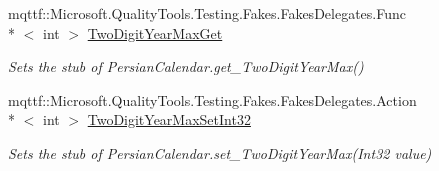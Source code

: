 \begin{DoxyCompactItemize}
mqttf\-::\-Microsoft.\-Quality\-Tools.\-Testing.\-Fakes.\-Fakes\-Delegates.\-Func\\*
$<$ int $>$ \hyperlink{class_system_1_1_globalization_1_1_fakes_1_1_stub_persian_calendar_adca0ea940f3a9157014cf66099d4a205}{Two\-Digit\-Year\-Max\-Get}
\begin{DoxyCompactList}\small\item\em Sets the stub of Persian\-Calendar.\-get\-\_\-\-Two\-Digit\-Year\-Max()\end{DoxyCompactList}\item 
mqttf\-::\-Microsoft.\-Quality\-Tools.\-Testing.\-Fakes.\-Fakes\-Delegates.\-Action\\*
$<$ int $>$ \hyperlink{class_system_1_1_globalization_1_1_fakes_1_1_stub_persian_calendar_a8f5f7a66582a76c82265ff5c66c70cd7}{Two\-Digit\-Year\-Max\-Set\-Int32}
\begin{DoxyCompactList}\small\item\em Sets the stub of Persian\-Calendar.\-set\-\_\-\-Two\-Digit\-Year\-Max(\-Int32 value)\end{DoxyCompactList}\end{DoxyCompactItemize}
